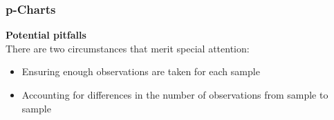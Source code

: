 \documentclass[Charts101.tex]{subfiles}
\begin{document}
\begin{frame}
	\frametitle{p-Charts}
	\Large
\noindent \textbf{Potential pitfalls}\\
There are two circumstances that merit special attention:
\begin{itemize}
\item Ensuring enough observations are taken for each sample
\item Accounting for differences in the number of observations from sample to sample
\end{itemize}


\end{frame}
\end{document}
